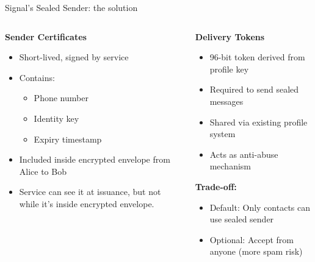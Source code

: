 \documentclass[aspectratio=169, lualatex, handout]{beamer}
\begin{document}
\begin{frame}{Signal's Sealed Sender: the solution}
	\begin{columns}
		\begin{column}{0.5\textwidth}
			\textbf{Sender Certificates}
			\begin{itemize}
				\item Short-lived, signed by service
				\item Contains:
				      \begin{itemize}
					      \item Phone number
					      \item Identity key
					      \item Expiry timestamp
				      \end{itemize}
				\item Included inside encrypted envelope from Alice to Bob
				\item Service can see it at issuance, but not while it's inside encrypted envelope.
			\end{itemize}
		\end{column}
		\begin{column}{0.5\textwidth}
			\textbf{Delivery Tokens}
			\begin{itemize}
				\item 96-bit token derived from profile key
				\item Required to send sealed messages
				\item Shared via existing profile system
				\item Acts as anti-abuse mechanism
			\end{itemize}
			\textbf{Trade-off:}
			\begin{itemize}
				\item Default: Only contacts can use sealed sender
				\item Optional: Accept from anyone (more spam risk)
			\end{itemize}
		\end{column}
	\end{columns}
\end{frame}
\end{document}
